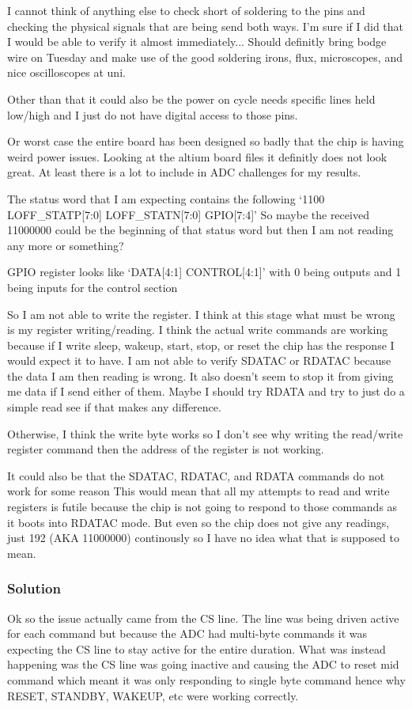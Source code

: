 I cannot think of anything else to check short of soldering to the pins and checking
the physical signals that are being send both ways. I'm sure if I did that I would be able
to verify it almost immediately... Should definitly bring bodge wire on Tuesday and make
use of the good soldering irons, flux, microscopes, and nice oscilloscopes at uni.

Other than that it could also be the power on cycle needs specific lines held low/high
and I just do not have digital access to those pins.

Or worst case the entire board has been designed so badly that the chip is having weird
power issues. Looking at the altium board files it definitly does not look great.
At least there is a lot to include in ADC challenges for my results.


The status word that I am expecting contains the following
`1100 LOFF\_STATP[7:0] LOFF\_STATN[7:0] GPIO[7:4]'
So maybe the received 11000000 could be the beginning of that status word but then I
am not reading any more or something?

GPIO register looks like `DATA[4:1] CONTROL[4:1]' with 0 being outputs and 1 being inputs
for the control section

So I am not able to write the register. I think at this stage what must be wrong is my
register writing/reading.
I think the actual write commands are working
because if I write sleep, wakeup, start, stop, or reset
the chip has the response I would expect it to have.
I am not able to verify SDATAC or RDATAC because the data I am then reading is wrong.
It also doesn't seem to stop it from giving me data if I send either of them.
Maybe I should try RDATA and try to just do a simple read see if that makes any difference.

Otherwise, I think the write byte works so I don't see why writing the read/write register
command then the address of the register is not working.

It could also be that the SDATAC, RDATAC, and RDATA commands do not work for some reason
This would mean that all my attempts to read and write registers is futile because
the chip is not going to respond to those commands as it boots into RDATAC mode.
But even so the chip does not give any readings, just 192 (AKA 11000000) continously
so I have no idea what that is supposed to mean.


\subsubsection{Solution}
Ok so the issue actually came from the CS line. The line was being driven active for each
command but because the ADC had multi-byte commands it was expecting the CS line to stay
active for the entire duration.
What was instead happening was the CS line was going inactive
and causing the ADC to reset mid command which meant it was only responding to single byte
command hence why RESET, STANDBY, WAKEUP, etc were working correctly.

